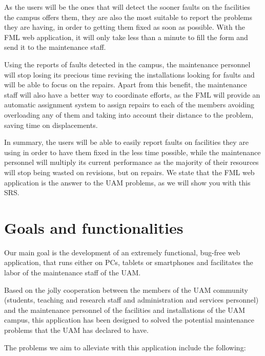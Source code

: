 \documentclass{report}
\begin{document}
As the users will be the ones that will detect the sooner faults on the facilities the campus offers them, they are also the most suitable to report the problems they are having, in order to getting them fixed as soon as possible. With the FML web application, it will only take less than a minute to fill the form and send it to the maintenance staff.

Using the reports of faults detected in the campus, the maintenance personnel will stop losing its precious time revising the installations looking for faults and will be able to focus on the repairs. Apart from this benefit, the maintenance staff will also have a better way to coordinate efforts, as the FML will provide an automatic assignment system to assign repairs to each of the members avoiding overloading any of them and taking into account their distance to the problem, saving time on displacements.

In summary, the users will be able to easily report faults on facilities they are using in order to have them fixed in the less time possible, while the maintenance personnel will multiply its current performance as the majority of their resources will stop being wasted on revisions, but on repairs. We state that the FML web application is the answer to the UAM problems, as we will show you with this SRS.


\section{Goals and functionalities}

Our main goal is the development of an extremely functional, bug-free web application, that runs either on PCs, tablets or smartphones and facilitates the labor of the maintenance staff of the UAM.

Based on the jolly cooperation between the members of the UAM community (students, teaching and research staff and administration and services personnel) and the maintenance personnel of the facilities and installations of the UAM campus, this application has been designed to solved the potential maintenance problems that the UAM has declared to have.

The problems we aim to alleviate with this application include the following:
\end{document}
